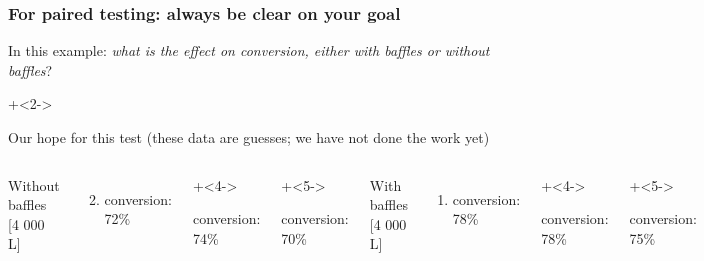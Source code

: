 \begin{frame}\frametitle{For paired testing: always be clear on your goal}
	
	\begin{exampleblock}{}
		\color{myGreen}In this example: \emph{what is the effect on conversion, either with baffles or without baffles}?
	\end{exampleblock}
	
	\onslide+<2->{
	\vspace{12pt}
	Our hope for this test (these data are guesses; we have not done the work yet)
	
	\vspace{12pt}
	\vspace{12pt}
	\begin{columns}[T]
			\centerline{{\color{myOrange}Without baffles} [4 000 L]}
			
			\vspace{12pt}
			\begin{enumerate}
				\setcounter{enumi}{1}
				\item	conversion: 72\%
			\end{enumerate}
			\begin{enumerate}
				\setcounter{enumi}{3}
				\onslide+<4->{\item	conversion: 74\%}
			\end{enumerate}
			\begin{enumerate}
				\setcounter{enumi}{5}
				\onslide+<5->{\item	conversion: 70\%}
			\end{enumerate}
			
			
		\column{0.3\textwidth}
			\centerline{{\color{myOrange}With baffles} [4 000 L]}
			
			\vspace{12pt}
			\begin{enumerate}
				\setcounter{enumi}{0}
				\item	conversion: 78\%
			\end{enumerate}
			\begin{enumerate}
				\setcounter{enumi}{2}
				\onslide+<4->{\item	conversion: 78\%}
			\end{enumerate}
			\begin{enumerate}
				\setcounter{enumi}{4}
				\onslide+<5->{\item	conversion: 75\%}
			\end{enumerate}




\end{columns}}
\end{frame}
